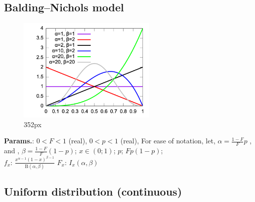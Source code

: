     
        
\subsection{Balding–Nichols model}


    \begin{figure}[H]
        \centering
        \includegraphics[width=0.6\textwidth]{images/Balding_nichols_pdf.png}
        \caption{352px}
    \end{figure}




    {\color{darkblue} \textbf{Params.}:} {$0 < F < 1$ (real),  $0< p < 1$ (real),  For ease of notation, let,  $\alpha=\tfrac{1-F}{F}p$ , and ,  $\beta=\tfrac{1-F}{F}(1-p)$}; {$x \in (0; 1)\!$}; {$p\!$}; {$Fp(1-p)\!$};\hspace{0.5cm}\\{\color{darkblue} \textbf{$f_x$}:} {$\frac{x^{\alpha-1}(1-x)^{\beta-1}} {\mathrm{B}(\alpha,\beta)}\!$}{\color{darkblue} \textbf{$F_x$}:} {$I_x(\alpha,\beta)\!$}



    
        
\subsection{Uniform distribution (continuous)}


